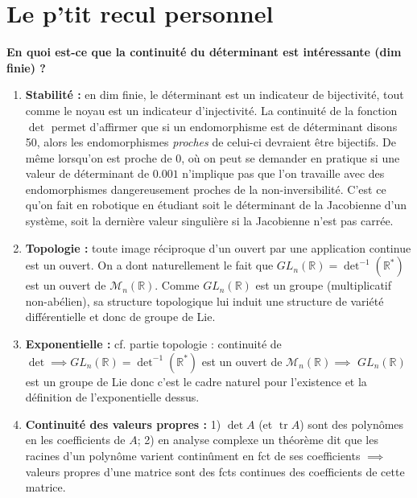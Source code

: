 \documentclass[10pt, a4paper, parskip=full, twoside, twocolumn]{report}
\newcommand{\IR}{\mathbb{R}}
\newcommand{\M}{\mathcal{M}}
\DeclareMathOperator{\tr}{tr}
\begin{document}
\section*{Le p'tit recul personnel}
\textbf{En quoi est-ce que la continuité du déterminant est intéressante (dim finie) ?}
\begin{enumerate}
	\item \textbf{Stabilité :} en dim finie, le déterminant est un indicateur de bijectivité, tout comme le noyau est un indicateur d'injectivité. La continuité de la fonction $\det$ permet d'affirmer que si un endomorphisme est de déterminant disons 50, alors les endomorphismes \emph{proches} de celui-ci devraient être bijectifs. De même lorsqu'on est proche de $0$, où on peut se demander en pratique si une valeur de déterminant de $0.001$ n'implique pas que l'on travaille avec des endomorphismes dangereusement proches de la non-inversibilité. C'est ce qu'on fait en robotique en étudiant soit le déterminant de la Jacobienne d'un système, soit la dernière valeur singulière si la Jacobienne n'est pas carrée.
	\item \textbf{Topologie :} toute image réciproque d'un ouvert par une application continue est un ouvert. On a dont naturellement le fait que $GL_n(\IR) = \det^{-1}(\IR^*)$ est un ouvert de $\M_n(\IR)$. Comme $GL_n(\IR)$ est un groupe (multiplicatif non-abélien), sa structure topologique lui induit une structure de variété différentielle et donc de groupe de Lie.
	\item \textbf{Exponentielle :} cf. partie topologie : continuité de $\det \implies GL_n(\IR) = \det^{-1}(\IR^*)$ est un ouvert de $\M_n(\IR) \implies$ $GL_n(\IR)$ est un groupe de Lie donc c'est le cadre naturel pour l'existence et la définition de l'exponentielle dessus.
	\item \textbf{Continuité des valeurs propres :} 1) $\det A$ (et $\tr A$) sont des polynômes en les coefficients de $A$; 2) en analyse complexe un théorème dit que les racines d'un polynôme varient continûment en fct de ses coefficients $\implies$ valeurs propres d'une matrice sont des fcts continues des coefficients de cette matrice.
\end{enumerate}
\end{document}
